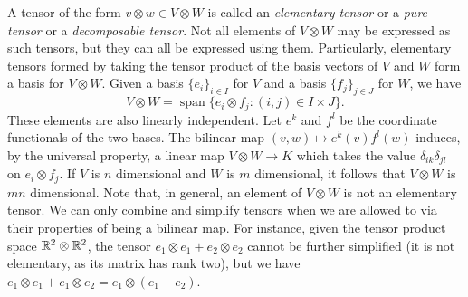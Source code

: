 \documentclass[a4paper,12pt]{article}
\begin{document}
A tensor of the form $v \otimes w \in V \otimes W$ is called an \emph{elementary tensor} or a \emph{pure tensor} or a \emph{decomposable tensor}.
Not all elements of $V \otimes W$ may be expressed as such tensors, but they can all be expressed using them.
Particularly, elementary tensors formed by taking the tensor product of the basis vectors of $V$ and $W$ form a basis for $V \otimes W$.
Given a basis $\{e_i\}_{i \in I}$ for $V$ and a basis $\{f_j\}_{j \in J}$ for $W$, we have
\begin{equation}
    V \otimes W = \operatorname{span}\{e_i \otimes f_j : (i, j) \in I \times J\}.
\end{equation}
These elements are also linearly independent.
Let $e^k$ and $f^l$ be the coordinate functionals of the two bases.
The bilinear map $(v, w) \mapsto e^k(v) f^l(w)$ induces, by the universal property, a linear map $V \otimes W \to K$ which takes the value $\delta_{ik}\delta_{jl}$ on $e_i \otimes f_j$.
If $V$ is $n$ dimensional and $W$ is $m$ dimensional, it follows that $V \otimes W$ is $mn$ dimensional.
Note that, in general, an element of $V \otimes W$ is not an elementary tensor.
We can only combine and simplify tensors when we are allowed to via their properties of being a bilinear map.
For instance, given the tensor product space $\mathbb{R}^2 \otimes \mathbb{R}^2$, the tensor $e_1 \otimes e_1 + e_2 \otimes e_2$ cannot be further simplified (it is not elementary, as its matrix has rank two), but we have $e_1 \otimes e_1 + e_1 \otimes e_2 = e_1 \otimes (e_1 + e_2)$.
\end{document}
